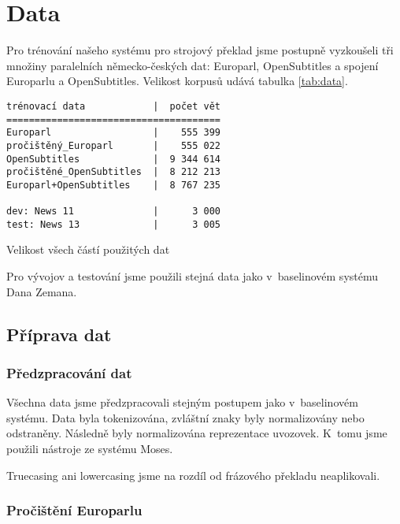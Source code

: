 \documentclass[a4]{article}
\begin{document}

\section{Data}

Pro trénování našeho systému pro strojový překlad jsme postupně vyzkoušeli tři množiny
paralelních německo-českých dat: Europarl, OpenSubtitles a spojení Europarlu
a OpenSubtitles. Velikost korpusů udává tabulka \ref{tab:data}.

\begin{table}[ht]
\begin{verbatim}
trénovací data            |  počet vět
======================================
Europarl                  |    555 399
pročištěný_Europarl       |    555 022
OpenSubtitles             |  9 344 614
pročištěné_OpenSubtitles  |  8 212 213
Europarl+OpenSubtitles    |  8 767 235
                          
dev: News 11              |      3 000
test: News 13             |      3 005
\end{verbatim}
\caption{Velikost všech částí použitých dat}
\label{tab:data}
\end{table}


Pro vývojov a testování jsme použili stejná data jako v~baselinovém systému
Dana Zemana.

\subsection{Příprava dat}

\subsubsection{Předzpracování dat}

Všechna data jsme předzpracovali stejným postupem jako v~baselinovém
systému. Data byla tokenizována, zvláštní znaky byly
normalizovány nebo odstraněny. Následně byly normalizována reprezentace
uvozovek. K~tomu jsme použili nástroje ze systému Moses\cite{moses}.

Truecasing ani lowercasing jsme na rozdíl od frázového překladu neaplikovali.


\subsubsection{Pročištění Europarlu}
\end{document}
